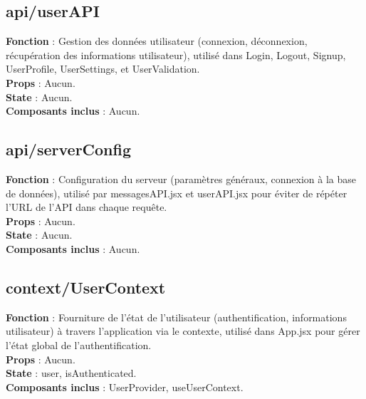 \documentclass{article}
\begin{document}
\subsection*{api/userAPI}
\textbf{Fonction} : Gestion des données utilisateur (connexion, déconnexion, récupération des informations utilisateur), utilisé dans Login, Logout, Signup, UserProfile, UserSettings, et UserValidation.\\
\textbf{Props} : Aucun.\\
\textbf{State} : Aucun.\\
\textbf{Composants inclus} : Aucun.

\subsection*{api/serverConfig}
\textbf{Fonction} : Configuration du serveur (paramètres généraux, connexion à la base de données), utilisé par messagesAPI.jsx et userAPI.jsx pour éviter de répéter l’URL de l’API dans chaque requête.\\
\textbf{Props} : Aucun.\\
\textbf{State} : Aucun.\\
\textbf{Composants inclus} : Aucun.

\subsection*{context/UserContext}
\textbf{Fonction} : Fourniture de l'état de l'utilisateur (authentification, informations utilisateur) à travers l'application via le contexte, utilisé dans App.jsx pour gérer l’état global de l’authentification.\\
\textbf{Props} : Aucun.\\
\textbf{State} : user, isAuthenticated.\\
\textbf{Composants inclus} : UserProvider, useUserContext.
\end{document}
